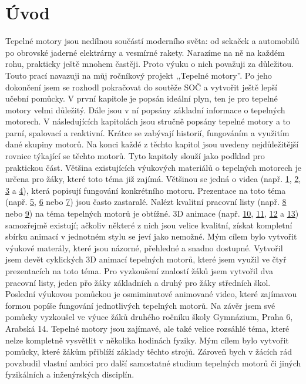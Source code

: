 \section{Úvod}
{Tepelné motory jsou nedílnou součástí moderního světa: od sekaček a automobilů po obrovské jaderné elektrárny a vesmírné rakety. Narazíme na ně na každém rohu, prakticky ještě mnohem častěji. Proto výuku o nich považuji za důležitou. Touto prací navazuji na můj ročníkový projekt ,,Tepelné motory”. Po jeho dokončení jsem se rozhodl pokračovat do soutěže SOČ a vytvořit ještě lepší učební pomůcky.}\odst
{V první kapitole je popsán ideální plyn, ten je pro tepelné motory velmi důležitý. Dále jsou v ní popsány základní informace o tepelných motorech. V následujících kapitolách jsou stručně popsány tepelné motory a to parní, spalovací a reaktivní. Krátce se zabývají historií, fungováním a využitím dané skupiny motorů. Na konci každé z těchto kapitol jsou uvedeny nejdůležitější rovnice týkající se těchto motorů. Tyto kapitoly slouží jako podklad pro praktickou část.}\odst
{Většina existujících výukových materiálů o tepelných motorech je určena pro žáky, které toto téma již zajímá. Většinou se jedná o videa (např. \href{https://www.youtube.com/watch?v=k9DhdvbmRiw}{1}, \href{https://www.youtube.com/watch?v=dR1pyp3q9Ko}{2}, \href{https://www.youtube.com/watch?v=eP8nWqcWmAc}{3} a \href{https://www.youtube.com/watch?v=Fpbg1jUh36M}{4}), která popisují fungování konkrétního motoru. Prezentace na toto téma (např. \href{https://zs-nucice.cz/UserFiles/File/eu_new_361-400/VY_32_INOVACE_374.pdf}{5}, \href{https://view.officeapps.live.com/op/view.aspx?src=http://dumy.cz/nahled/73077}{6} nebo \href{https://slideplayer.cz/slide/12677857/}{7}) jsou často zastaralé. Nalézt kvalitní pracovní listy (např. \href{https://view.officeapps.live.com/op/view.aspx?src=http://dumy.cz/nahled/117673}{8} nebo \href{https://www.soshlinky.cz/documents/uploads/71\%20Motory.xlsx}{9}) na téma tepelných motorů je obtížné. 3D animace (např. \href{https://www.youtube.com/watch?v=kWRRHRWuduk}{10}, \href{https://www.youtube.com/watch?v=ZQvfHyfgBtA&t=26s}{11}, \href{https://www.youtube.com/watch?v=MUxP3PCDRTE}{12} a \href{https://www.youtube.com/watch?v=Iiu3UyxLEHk}{13}) samozřejmě existují; ačkoliv některé z nich jsou velice kvalitní, získat kompletní sbírku animací v jednotném stylu se jeví jako nemožné.}\odst
{Mým cílem bylo vytvořit výukové materály, které jsou názorné, přehledné a snadno dostupné. Vytvořil jsem devět cyklických 3D animací tepelných motorů, které jsem využil ve čtyř prezentacích na toto téma. Pro vyzkoušení znalostí žáků jsem vytvořil dva pracovní listy, jeden přo žáky základních a druhý pro žáky středních škol. Poslední výukovou pomůckou je osmiminutové animované video, které zajímavou formou popíše fungování jednotlivých tepelných motorů. Na závěr jsem své pomůcky vyzkoušel ve výuce žáků druhého ročníku školy Gymnázium, Praha 6, Arabská 14.}\odst
{Tepelné motory jsou zajímavé, ale také velice rozsáhlé téma, které nelze kompletně vysvětlit v několika hodinách fyziky. Mým cílem bylo vytvořit pomůcky, které žákům přiblíží základy těchto strojů. Zároveň bych v žácích rád povzbudil vlastní ambici pro další samostatné studium tepelných motorů či jiných fyzikálních a inženýrských disciplín.}